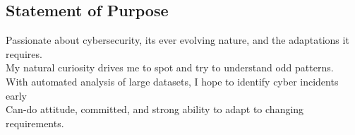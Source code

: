 \documentclass[mm, 11pt]{simple_style}
\begin{document}
\begin{resume}
\section{Statement of Purpose}

Passionate about cybersecurity, its ever evolving nature, and the adaptations it requires.\\
My natural curiosity drives me to spot and try to understand odd patterns.\\
With automated analysis of large datasets, I hope to identify cyber incidents early\\
Can-do attitude, committed, and strong ability to adapt to changing requirements.\\
%
\sectionline


\end{resume}
\end{document}
